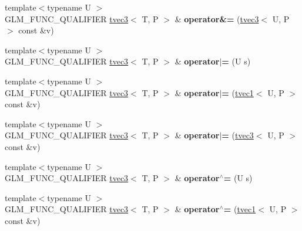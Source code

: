 \begin{DoxyCompactItemize}
\item 
\hypertarget{structglm_1_1tvec3_a6ce7276861f4b1402c5dcf4324fac897}{{\footnotesize template$<$typename U $>$ }\\G\-L\-M\-\_\-\-F\-U\-N\-C\-\_\-\-Q\-U\-A\-L\-I\-F\-I\-E\-R \hyperlink{structglm_1_1tvec3}{tvec3}$<$ T, P $>$ \& {\bfseries operator\&=} (\hyperlink{structglm_1_1tvec3}{tvec3}$<$ U, P $>$ const \&v)}\label{structglm_1_1tvec3_a6ce7276861f4b1402c5dcf4324fac897}

\item 
\hypertarget{structglm_1_1tvec3_aa7a1ad4459cf09d317617d1be3d7b937}{{\footnotesize template$<$typename U $>$ }\\G\-L\-M\-\_\-\-F\-U\-N\-C\-\_\-\-Q\-U\-A\-L\-I\-F\-I\-E\-R \hyperlink{structglm_1_1tvec3}{tvec3}$<$ T, P $>$ \& {\bfseries operator$\vert$=} (U s)}\label{structglm_1_1tvec3_aa7a1ad4459cf09d317617d1be3d7b937}

\item 
\hypertarget{structglm_1_1tvec3_a36f603bc6496f2bc32b3e3001ba38e57}{{\footnotesize template$<$typename U $>$ }\\G\-L\-M\-\_\-\-F\-U\-N\-C\-\_\-\-Q\-U\-A\-L\-I\-F\-I\-E\-R \hyperlink{structglm_1_1tvec3}{tvec3}$<$ T, P $>$ \& {\bfseries operator$\vert$=} (\hyperlink{structglm_1_1tvec1}{tvec1}$<$ U, P $>$ const \&v)}\label{structglm_1_1tvec3_a36f603bc6496f2bc32b3e3001ba38e57}

\item 
\hypertarget{structglm_1_1tvec3_ad176614ebae121c5efbb4a28c29080ef}{{\footnotesize template$<$typename U $>$ }\\G\-L\-M\-\_\-\-F\-U\-N\-C\-\_\-\-Q\-U\-A\-L\-I\-F\-I\-E\-R \hyperlink{structglm_1_1tvec3}{tvec3}$<$ T, P $>$ \& {\bfseries operator$\vert$=} (\hyperlink{structglm_1_1tvec3}{tvec3}$<$ U, P $>$ const \&v)}\label{structglm_1_1tvec3_ad176614ebae121c5efbb4a28c29080ef}

\item 
\hypertarget{structglm_1_1tvec3_a9a610352c52ae19c8ff18fa4bbcdccd5}{{\footnotesize template$<$typename U $>$ }\\G\-L\-M\-\_\-\-F\-U\-N\-C\-\_\-\-Q\-U\-A\-L\-I\-F\-I\-E\-R \hyperlink{structglm_1_1tvec3}{tvec3}$<$ T, P $>$ \& {\bfseries operator$^\wedge$=} (U s)}\label{structglm_1_1tvec3_a9a610352c52ae19c8ff18fa4bbcdccd5}

\item 
\hypertarget{structglm_1_1tvec3_a03040ddfeb97c166a0f6e4888f4f75fe}{{\footnotesize template$<$typename U $>$ }\\G\-L\-M\-\_\-\-F\-U\-N\-C\-\_\-\-Q\-U\-A\-L\-I\-F\-I\-E\-R \hyperlink{structglm_1_1tvec3}{tvec3}$<$ T, P $>$ \& {\bfseries operator$^\wedge$=} (\hyperlink{structglm_1_1tvec1}{tvec1}$<$ U, P $>$ const \&v)}\label{structglm_1_1tvec3_a03040ddfeb97c166a0f6e4888f4f75fe}


\end{DoxyCompactItemize}

